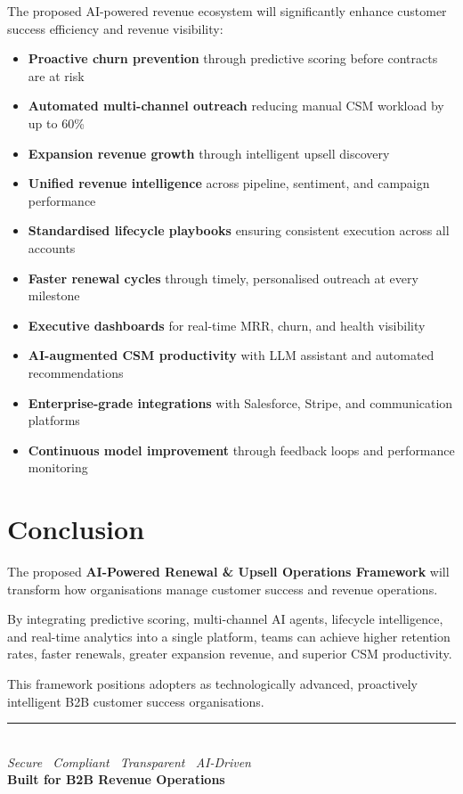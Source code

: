 \documentclass[11pt,a4paper]{article}
\begin{document}
The proposed AI-powered revenue ecosystem will significantly enhance customer success efficiency and revenue visibility:

\begin{itemize}[leftmargin=1.5em, itemsep=0.35em]
    \item \textbf{Proactive churn prevention} through predictive scoring before contracts are at risk
    \item \textbf{Automated multi-channel outreach} reducing manual CSM workload by up to 60\%
    \item \textbf{Expansion revenue growth} through intelligent upsell discovery
    \item \textbf{Unified revenue intelligence} across pipeline, sentiment, and campaign performance
    \item \textbf{Standardised lifecycle playbooks} ensuring consistent execution across all accounts
    \item \textbf{Faster renewal cycles} through timely, personalised outreach at every milestone
    \item \textbf{Executive dashboards} for real-time MRR, churn, and health visibility
    \item \textbf{AI-augmented CSM productivity} with LLM assistant and automated recommendations
    \item \textbf{Enterprise-grade integrations} with Salesforce, Stripe, and communication platforms
    \item \textbf{Continuous model improvement} through feedback loops and performance monitoring
\end{itemize}

\section{Conclusion}

The proposed \textbf{AI-Powered Renewal \& Upsell Operations Framework} will transform how organisations manage customer success and revenue operations.

By integrating predictive scoring, multi-channel AI agents, lifecycle intelligence, and real-time analytics into a single platform, teams can achieve higher retention rates, faster renewals, greater expansion revenue, and superior CSM productivity.

This framework positions adopters as technologically advanced, proactively intelligent B2B customer success organisations.

\vspace{1.5em}
\begin{center}
    {\color{brandblue}\rule{0.6\textwidth}{1.5pt}}\\[0.5em]
    \textit{Secure \textperiodcentered\ Compliant \textperiodcentered\ Transparent \textperiodcentered\ AI-Driven}\\[0.3em]
    \textbf{\color{brandblue}Built for B2B Revenue Operations}
\end{center}
\end{document}
